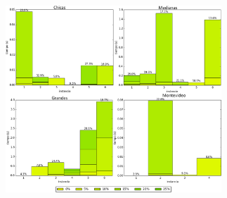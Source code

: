\centering
\includegraphics[width=9cm,height=7cm]{./evaluacion_experimental/mejoras_greedy_alio/greedy_costo_Chicas}\\